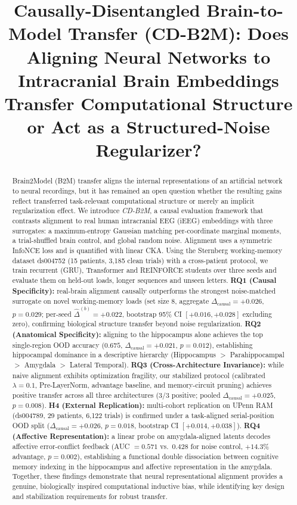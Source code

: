 \documentclass[conference]{IEEEtran}
\title{Causally-Disentangled Brain-to-Model Transfer (CD-B2M): Does Aligning Neural Networks to Intracranial Brain Embeddings Transfer Computational Structure or Act as a Structured-Noise Regularizer?}
\author{\parbox{\textwidth}{\small\centering
\hfill
\authcell{Rachana Bonigala}{U24AI064}\hfill
\authcell{Neha Sharma}{U24AI050}\par\vspace{2ex}
\authcell{Golla Abhinav Kumar}{U24AI019}\hfill
\authcell{Chris Misquith}{U24AI002}\par\vspace{2ex}
\authcell{Archana Deshmukh}{U24AI077}\hfill
\authcell{Sudhakar Mishra}{Assistant Professor (Project Guide)}}}
\newcommand{\dcausal}{\Delta_{\mathrm{causal}}}
\begin{document}
\maketitle

\begin{abstract}
Brain2Model (B2M) transfer aligns the internal representations of an artificial network to neural recordings, but it has
remained an open question whether the resulting gains reflect transferred task-relevant computational structure or merely an implicit
regularization effect. We introduce \emph{CD-B2M}, a causal evaluation framework that contrasts alignment to real
human intracranial EEG (iEEG) embeddings with three surrogates: a maximum-entropy Gaussian matching per-coordinate marginal moments,
a trial-shuffled brain control, and global random noise. Alignment uses a symmetric InfoNCE loss and is quantified with linear CKA.
Using the Sternberg working-memory dataset ds004752 (15 patients, 3{,}185 clean trials) with a cross-patient protocol, we train recurrent (GRU),
Transformer and REINFORCE students over three seeds and evaluate them on held-out loads, longer sequences and unseen letters.
\textbf{RQ1 (Causal Specificity):} real-brain alignment causally outperforms the strongest noise-matched surrogate on novel working-memory loads (set size 8, aggregate $\dcausal=+0.026$, $p=0.029$; per-seed $\hat\Delta^{(b)}=+0.022$, bootstrap 95\% CI $[+0.016,+0.028]$ excluding zero), confirming biological structure transfer beyond noise regularization.
\textbf{RQ2 (Anatomical Specificity):} aligning to the hippocampus alone achieves the top single-region OOD accuracy ($0.675$, $\dcausal=+0.021$, $p=0.012$), establishing hippocampal dominance in a descriptive hierarchy (Hippocampus $>$ Parahippocampal $>$ Amygdala $>$ Lateral Temporal).
\textbf{RQ3 (Cross-Architecture Invariance):} while naive alignment exhibits optimization fragility, our stabilized protocol (calibrated $\lambda=0.1$, Pre-LayerNorm, advantage baseline, and memory-circuit pruning) achieves positive transfer across all three architectures (3/3 positive; pooled $\dcausal=+0.025$, $p=0.008$).
\textbf{H4 (External Replication):} multi-cohort replication on UPenn RAM (ds004789, 29 patients, 6{,}122 trials) is confirmed under a task-aligned serial-position OOD split ($\dcausal=+0.026$, $p=0.018$, bootstrap CI $[+0.014,+0.038]$).
\textbf{RQ4 (Affective Representation):} a linear probe on amygdala-aligned latents decodes affective error-conflict feedback (AUC $=0.571$ vs.\ $0.428$ for noise control, $+14.3\%$ advantage, $p=0.002$), establishing a functional double dissociation between cognitive memory indexing in the hippocampus and affective representation in the amygdala.
Together, these findings demonstrate that neural representational alignment provides a genuine, biologically inspired computational inductive bias, while identifying key design and stabilization requirements for robust transfer.
\end{abstract}
\end{document}
